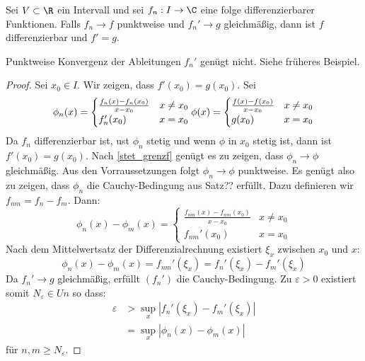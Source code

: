 \documentclass{mycourse}
\begin{document}
\begin{thm} \label{12.3}
Sei $V\subset\R$ ein Intervall und sei $f_n:I\to\C$ eine folge differenzierbarer Funktionen.
Falls $f_n\to f$ punktweise und $f_n'\to g$ gleichmäßig, dann ist $f$ differenzierbar und $f'=g$.
\begin{note}
Punktweise Konvergenz der Ableitungen $f_n'$ genügt nicht. Siehe früheres Beispiel.
\end{note}

\begin{proof}
Sei $x_0\in I$. Wir zeigen, dass $f'(x_0)=g(x_0)$.
Sei
\[
\phi_n(x)=\begin{cases}
\frac{f_n(x)-f_n(x_0)}{x-x_0}&x\neq x_0\\
f_n'(x_0)&x=x_0
\end{cases}\\
\phi(x)=\begin{cases}
\frac{f(x)-f(x_0)}{x-x_0}&x\neq x_0\\
g(x_0)&x=x_0
\end{cases}
\]
Da $f_n$ differenzierbar ist, ust $\phi_n$ stetig und wenn $\phi$ in $x_0$ stetig ist, dann ist $f'(x_0)=g(x_0)$.
Nach \ref{stet_grenzf} genügt es zu zeigen, dass $\phi_n\to\phi$ gleichmäßig.
Aus den Vorraussetzungen folgt $\phi_n\to\phi$ punktweise.
Es genügt also zu zeigen, dass $\phi_n$ die Cauchy-Bedingung aus Satz?? erfüllt.
Dazu definieren wir $f_{nm}=f_n-f_m$.
Dann:
\[
\phi_n(x)-\phi_m(x)=\begin{cases}
\frac{f_{nm}(x)-f_{nm}(x_0)}{x-x_0}& x\neq x_0\\
f_{nm}'(x_0) & x=x_0
\end{cases}
\]
Nach dem Mittelwertsatz der Differenzialrechnung existiert $\xi_x$ zwischen $x_0$ und $x$:
\[
\phi_n(x)-\phi_m(x)= f_{nm}'(\xi_x)=f_n'(\xi_x)-f_m'(\xi_x)
\]
Da $f_n'\to g$ gleichmäßig, erfüllt $(f_n')$ die Cauchy-Bedingung. 
Zu $\varepsilon>0$ existiert somit $N_\varepsilon\in Un$ so dass:
\begin{align*}
\varepsilon&>\sup_x|f_n'(\xi_x)-f_m'(\xi_x)|\\
&=\sup_x|\phi_n(x)-\phi_m(x)|
\end{align*}
für $n,m\ge N_\varepsilon$.
\end{proof}
\end{thm}
\end{document}
